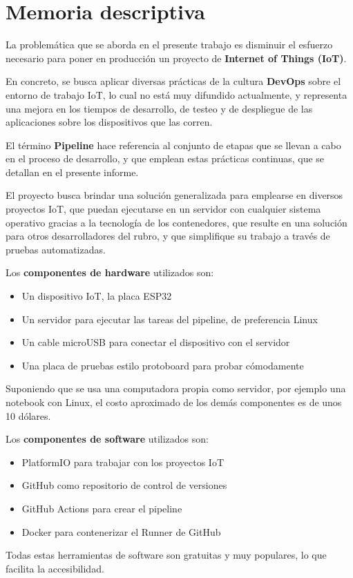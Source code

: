 \chapter{Memoria descriptiva}\label{cap:memoria}
La problemática que se aborda en el presente trabajo es disminuir el esfuerzo necesario para poner en producción un proyecto de \textbf{Internet of Things (IoT)}.

En concreto, se busca aplicar diversas prácticas de la cultura \textbf{DevOps} sobre el entorno de trabajo IoT, lo cual no está muy difundido actualmente, y representa una mejora en los tiempos de desarrollo, de testeo y de despliegue de las aplicaciones sobre los dispositivos que las corren.

El término \textbf{Pipeline} hace referencia al conjunto de etapas que se llevan a cabo en el proceso de desarrollo, y que emplean estas prácticas continuas, que se detallan en el presente informe.

El proyecto busca brindar una solución generalizada para emplearse en diversos proyectos IoT, que puedan ejecutarse en un servidor con cualquier sistema operativo gracias a la tecnología de los contenedores, que resulte en una solución para otros desarrolladores del rubro, y que simplifique su trabajo a través de pruebas automatizadas.

Los \textbf{componentes de hardware} utilizados son:
\begin{itemize}
    \item Un dispositivo IoT, la placa ESP32
    \item Un servidor para ejecutar las tareas del pipeline, de preferencia Linux
    \item Un cable microUSB para conectar el dispositivo con el servidor
    \item Una placa de pruebas estilo protoboard para probar cómodamente
\end{itemize}

Suponiendo que se usa una computadora propia como servidor, por ejemplo una notebook con Linux, el costo aproximado de los demás componentes es de unos 10 dólares.

Los \textbf{componentes de software} utilizados son:
\begin{itemize}
\item PlatformIO para trabajar con los proyectos IoT
\item GitHub como repositorio de control de versiones
\item GitHub Actions para crear el pipeline
\item Docker para contenerizar el Runner de GitHub
\end{itemize}

Todas estas herramientas de software son gratuitas y muy populares, lo que facilita la accesibilidad.



